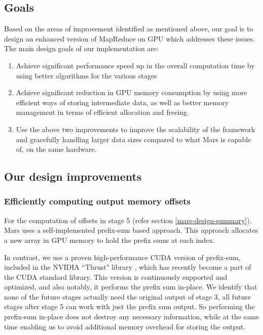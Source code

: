 \documentclass{article}
\begin{document}
\subsection{Goals}
Based on the areas of improvement identified as mentioned above, our goal is to design an enhanced version of MapReduce on GPU which addresses these issues. The main design goals of our implementation are:

\begin{enumerate}
    \item Achieve significant performance speed up in the overall computation time by using better algorithms for the various stages
    \item Achieve significant reduction in GPU memory consumption by using more efficient ways of storing intermediate data, as well as better memory management in terms of efficient allocation and freeing.
    \item Use the above two improvements to improve the scalability of the framework and gracefully handling larger data sizes compared to what Mars is capable of, on the same hardware.
\end{enumerate}

\subsection{Our design improvements} \label{our-improved-design}
\subsubsection{Efficiently computing output memory offsets}
For the computation of offsets in stage 5 (refer section \ref{mars-design-summary}), Mars uses a self-implemented prefix-sum based approach. This approach allocates a new array in GPU memory to hold the prefix sums at each index.

In contrast, we use a proven high-performance CUDA version of prefix-sum, included in the NVIDIA ``Thrust" library \cite{nvidia_thrust}, which has recently become a part of the CUDA standard library. This version is continuously supported and optimized, and also notably, it performs the prefix sum in-place. We identify that none of the future stages actually need the original output of stage 3, all future stages after stage 5 can work with just the prefix sum output. So performing the prefix-sum in-place does not destroy any necessary information, while at the same time enabling us to avoid additional memory overhead for storing the output.
\end{document}
